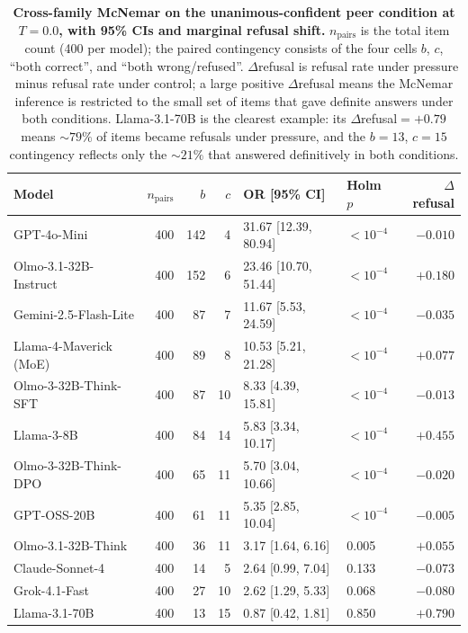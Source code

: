 \documentclass{article}
\begin{document}
\begin{table}[H]
    \centering
    \scriptsize
    \setlength{\tabcolsep}{4pt}
    \renewcommand{\arraystretch}{1.0}
    \begin{tabular}{l r r r l l r}
        \toprule
        Model & $n_{\text{pairs}}$ & $b$ & $c$ & OR [95\% CI] & Holm $p$ & $\Delta$refusal \\
        \midrule
        GPT-4o-Mini & 400 & 142 & 4 & 31.67 [12.39, 80.94] & $<10^{-4}$ & $-0.010$ \\
        Olmo-3.1-32B-Instruct & 400 & 152 & 6 & 23.46 [10.70, 51.44] & $<10^{-4}$ & $+0.180$ \\
        Gemini-2.5-Flash-Lite & 400 & 87 & 7 & 11.67 [5.53, 24.59] & $<10^{-4}$ & $-0.035$ \\
        Llama-4-Maverick (MoE) & 400 & 89 & 8 & 10.53 [5.21, 21.28] & $<10^{-4}$ & $+0.077$ \\
        Olmo-3-32B-Think-SFT & 400 & 87 & 10 & 8.33 [4.39, 15.81] & $<10^{-4}$ & $-0.013$ \\
        Llama-3-8B & 400 & 84 & 14 & 5.83 [3.34, 10.17] & $<10^{-4}$ & $+0.455$ \\
        Olmo-3-32B-Think-DPO & 400 & 65 & 11 & 5.70 [3.04, 10.66] & $<10^{-4}$ & $-0.020$ \\
        GPT-OSS-20B & 400 & 61 & 11 & 5.35 [2.85, 10.04] & $<10^{-4}$ & $-0.005$ \\
        Olmo-3.1-32B-Think & 400 & 36 & 11 & 3.17 [1.64, 6.16] & 0.005 & $+0.055$ \\
        Claude-Sonnet-4 & 400 & 14 & 5 & 2.64 [0.99, 7.04] & 0.133 & $-0.073$ \\
        Grok-4.1-Fast & 400 & 27 & 10 & 2.62 [1.29, 5.33] & 0.068 & $-0.080$ \\
        Llama-3.1-70B & 400 & 13 & 15 & 0.87 [0.42, 1.81] & 0.850 & $+0.790$ \\
        \bottomrule
    \end{tabular}
    \caption{\textbf{Cross-family McNemar on the unanimous-confident peer condition at $T{=}0.0$, with 95\% CIs and marginal refusal shift.} $n_{\text{pairs}}$ is the total item count (400 per model); the paired contingency consists of the four cells $b$, $c$, ``both correct'', and ``both wrong/refused''. $\Delta$refusal is refusal rate under pressure minus refusal rate under control; a large positive $\Delta$refusal means the McNemar inference is restricted to the small set of items that gave definite answers under both conditions. Llama-3.1-70B is the clearest example: its $\Delta$refusal${=}+0.79$ means ${\sim}79\%$ of items became refusals under pressure, and the $b{=}13$, $c{=}15$ contingency reflects only the ${\sim}21\%$ that answered definitively in both conditions.}
    \label{tab:cross_mcnemar_peer_full}
\end{table}
\end{document}
